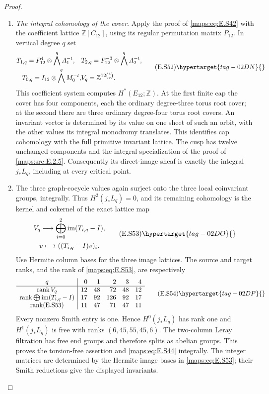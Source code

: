 \begin{proof}
\begin{enumerate}[label={$\langle1\rangle$\arabic*.},leftmargin=*]
\item \emph{The integral cohomology of the cover.}
Apply the proof of \eqref{maps:eq:E.S42} with the coefficient lattice
$\mathbb Z[C_{12}]$, using its regular permutation matrix
$P_{12}$. In vertical degree $q$ set
\[
 \begin{aligned}
 T_{1,q}=P_{12}^4\otimes\bigwedge^q A_1^{-t},\quad
 &T_{2,q}=P_{12}^{-3}\otimes\bigwedge^q A_2^{-t},\\
 T_{0,q}=I_{12}\otimes\bigwedge^q M_0^{-t},
 &V_q=\mathbb Z^{12\binom4q}.
 \end{aligned}
 \tag{E.S52}\hypertarget{tag-02DN}{}\label{maps:eq:E.S52}
\]
This coefficient system computes $H^*(E_{12};\mathbb Z)$.
 At the first finite
cap the cover has four components, each the ordinary
degree-three torus root cover; at the second there are
three ordinary degree-four torus root covers. An invariant
vector is determined by its value on one sheet of such
an orbit, with the other values its integral monodromy
translates. This identifies cap cohomology with the full
primitive invariant lattice. The cusp has twelve unchanged
components and the integral specialization of the proof of \cref{maps:src:E.2.5}.
Consequently its direct-image sheaf is exactly the integral
$j_*L_q$, including at every critical point.

\item The three graph-cocycle values again surject onto the
three local coinvariant groups, integrally. Thus $H^2(j_*L_q)=0$,
and its remaining cohomology is the kernel and cokernel
of the exact lattice map
\[
 \begin{gathered}
 V_q\longrightarrow
        \bigoplus_{i=0}^2\operatorname{im}(T_{i,q}-I),\\
           v\longmapsto((T_{i,q}-I)v)_i.
 \end{gathered}
 \tag{E.S53}\hypertarget{tag-02DO}{}\label{maps:eq:E.S53}
\]
Use Hermite column bases for the three image lattices. The source and target ranks,
and the rank of \eqref{maps:eq:E.S53}, are respectively
\[
 \begin{array}{c|rrrrr}
 q&0&1&2&3&4\\ \hline
 \operatorname{rank}V_q&12&48&72&48&12\\
 \operatorname{rank}\bigoplus\operatorname{im}(T_{i,q}-I)
                      &17&92&126&92&17\\
 \operatorname{rank}(\text{E.S53})&11&47&71&47&11
 \end{array}
 \tag{E.S54}\hypertarget{tag-02DP}{}\label{maps:eq:E.S54}
\]
Every nonzero Smith entry is one. Hence $H^0(j_*L_q)$
has rank one and $H^1(j_*L_q)$ is free with ranks
$(6,45,55,45,6)$. The two-column Leray filtration has
free end groups and therefore splits as abelian groups.
This proves the torsion-free assertion and \eqref{maps:eq:E.S44}
integrally. The integer matrices are determined by the Hermite image bases in
\eqref{maps:eq:E.S53}; their Smith reductions give the displayed invariants.


\end{enumerate}
\end{proof}
